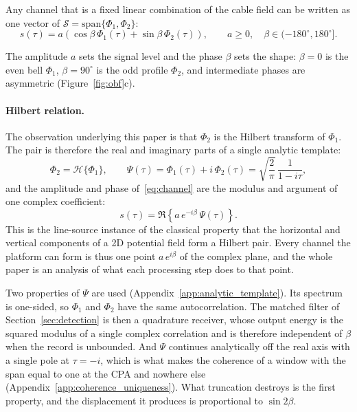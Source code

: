 Any channel that is a fixed linear combination of the cable field can be written as one vector of $\mathcal{S} = \mathrm{span}\{\Phi_1, \Phi_2\}$:
\begin{equation}
    s(\tau) = a \left( \cos\beta\, \Phi_1(\tau) + \sin\beta\, \Phi_2(\tau) \right),
    \qquad a \ge 0, \quad \beta \in (-180^{\circ}, 180^{\circ}].
    \label{eq:channel}
\end{equation}

The amplitude $a$ sets the signal level and the phase $\beta$ sets the shape: $\beta = 0$ is the even bell $\Phi_1$, $\beta = 90^{\circ}$ is the odd profile $\Phi_2$, and intermediate phases are asymmetric (Figure~\ref{fig:obf}c).

\paragraph{Hilbert relation.}
The observation underlying this paper is that $\Phi_2$ is the Hilbert transform of $\Phi_1$. The pair is therefore the real and imaginary parts of a single analytic template:
\begin{equation}
    \Phi_2 = \mathcal{H}\{\Phi_1\}, \qquad
    \Psi(\tau) = \Phi_1(\tau) + i\,\Phi_2(\tau) = \sqrt{\frac{2}{\pi}}\,\frac{1}{1 - i\tau},
    \label{eq:analytic}
\end{equation}
and the amplitude and phase of~\eqref{eq:channel} are the modulus and argument of one complex coefficient:
\begin{equation}
    s(\tau) = \Re\left\{ a\,e^{-i\beta}\,\Psi(\tau) \right\}.
    \label{eq:channel_complex}
\end{equation}
This is the line-source instance of the classical property that the horizontal and vertical components of a 2D potential field form a Hilbert pair. Every channel the platform can form is thus one point $a\,e^{i\beta}$ of the complex plane, and the whole paper is an analysis of what each processing step does to that point.

Two properties of $\Psi$ are used (Appendix~\ref{app:analytic_template}). Its spectrum is one-sided, so $\Phi_1$ and $\Phi_2$ have the same autocorrelation. The matched filter of Section~\ref{sec:detection} is then a quadrature receiver, whose output energy is the squared modulus of a single complex correlation and is therefore independent of $\beta$ when the record is unbounded. And $\Psi$ continues analytically off the real axis with a single pole at $\tau = -i$, which is what makes the coherence of a window with the span equal to one at the CPA and nowhere else (Appendix~\ref{app:coherence_uniqueness}). What truncation destroys is the first property, and the displacement it produces is proportional to $\sin 2\beta$.

